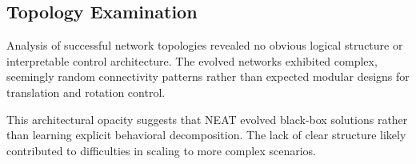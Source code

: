 \subsection{Topology Examination}

Analysis of successful network topologies revealed no obvious logical structure or interpretable control architecture. The evolved networks exhibited complex, seemingly random connectivity patterns rather than expected modular designs for translation and rotation control.

This architectural opacity suggests that NEAT evolved black-box solutions rather than learning explicit behavioral decomposition. The lack of clear structure likely contributed to difficulties in scaling to more complex scenarios.



